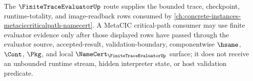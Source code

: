 The $\FiniteTraceEvaluatorUp$ route supplies the bounded trace, checkpoint, runtime-totality, and image-readback rows consumed by \autoref{ch:concrete-instances-metaciccriticalpath-namecert}. A MetaCIC critical-path consumer may use finite evaluator evidence only after those displayed rows have passed through the evaluator source, accepted-result, validation-boundary, componentwise $\hsame$, $\Cont$, $\Pkg$, and local $\NameCert_{\FiniteTraceEvaluatorUp}$ surface; it does not receive an unbounded runtime stream, hidden interpreter state, or host validation predicate.
